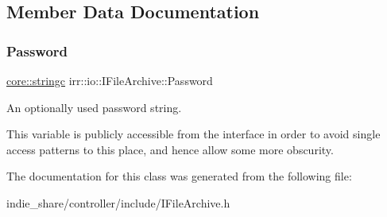 \subsection{Member Data Documentation}
\mbox{\label{classirr_1_1io_1_1IFileArchive_ae5b574864226b09c70518e163e59b6ba}} 
\subsubsection{\texorpdfstring{Password}{Password}}
{\footnotesize\ttfamily \hyperlink{namespaceirr_1_1core_ade1071a878633f2f6d8a75c5d11fec19}{core\+::stringc} irr\+::io\+::\+I\+File\+Archive\+::\+Password}



An optionally used password string. 

This variable is publicly accessible from the interface in order to avoid single access patterns to this place, and hence allow some more obscurity. 

The documentation for this class was generated from the following file\+:\begin{DoxyCompactItemize}
\item 
indie\+\_\+share/controller/include/I\+File\+Archive.\+h\end{DoxyCompactItemize}
